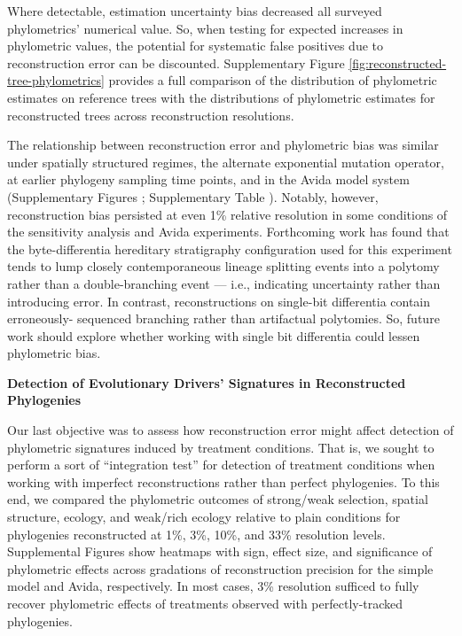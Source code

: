Where detectable, estimation uncertainty bias decreased all surveyed phylometrics' numerical value.
So, when testing for expected increases in phylometric values, the potential for systematic false positives due to reconstruction error can be discounted.
Supplementary Figure \ref{fig:reconstructed-tree-phylometrics} provides a full comparison of the distribution of phylometric estimates on reference trees with the distributions of phylometric estimates for reconstructed trees across reconstruction resolutions.

The relationship between reconstruction error and phylometric bias was similar under spatially structured regimes, the alternate exponential mutation operator, at earlier phylogeny sampling time points, and in the Avida model system (Supplementary Figures ; Supplementary Table ).
Notably, however, reconstruction bias persisted at even 1\% relative resolution in some conditions of the sensitivity analysis and Avida experiments.
Forthcoming work has found that the byte-differentia hereditary stratigraphy configuration used for this experiment tends to lump closely contemporaneous lineage splitting events into a polytomy rather than a double-branching event --- i.e., indicating uncertainty rather than introducing error.
In contrast, reconstructions on single-bit differentia contain erroneously- sequenced branching rather than artifactual polytomies.
So, future work should explore whether working with single bit differentia could lessen phylometric bias.

\noindent
\textbf{Detection of Evolutionary Drivers' Signatures in Reconstructed Phylogenies}

\noindent
Our last objective was to assess how reconstruction error might affect detection of phylometric signatures induced by treatment conditions.
That is, we sought to perform a sort of ``integration test'' for detection of treatment conditions when working with imperfect reconstructions rather than perfect phylogenies.
To this end, we compared the phylometric outcomes of strong/weak selection, spatial structure, ecology, and weak/rich ecology relative to plain conditions for phylogenies reconstructed at 1\%, 3\%, 10\%, and 33\% resolution levels.
Supplemental Figures  show heatmaps with sign, effect size, and significance of phylometric effects across gradations of reconstruction precision for the simple model and Avida, respectively.
In most cases, 3\% resolution sufficed to fully recover phylometric effects of treatments observed with perfectly-tracked phylogenies.
